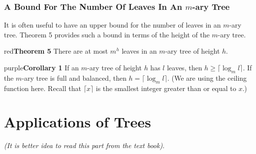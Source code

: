 \documentclass{article}
\begin{document}
\subsubsection{A Bound For The Number Of Leaves In An $m$-ary Tree}

It is often useful to have an upper bound for the number of leaves in an $m$-ary tree. Theorem 5 provides such a bound in terms of the height of the $m$-ary tree.

\begin{mybox}{red}{\textbf{Theorem 5}}
There are at most $m^h$ leaves in an $m$-ary tree of height $h$.
\end{mybox}

\begin{mybox}{purple}{\textbf{Corollary 1}}
If an $m$-ary tree of height $h$ has $l$ leaves, then $h \geq \lceil \log_m l \rceil$. If the $m$-ary tree is full and balanced, then $h = \lceil \log_m l \rceil$. (We are using the ceiling function here. Recall that $\lceil x \rceil$ is the smallest integer greater than or equal to $x$.)
\end{mybox}


\section{Applications of Trees}

\textit{(It is better idea to read this part from the text book)}.




\end{document}

